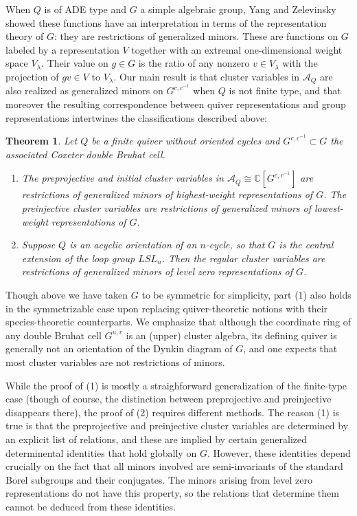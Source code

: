 \documentclass[12pt]{amsart}
\newcommand{\cA}{\mathcal{A}}
\newcommand{\CC}{\mathbb{C}}
\newtheorem{theorem}{Theorem}[section]
\theoremstyle{remark}
\numberwithin{equation}{section}
\begin{document}
When $Q$ is of ADE type and $G$ a simple algebraic group, Yang and Zelevinsky showed these functions have an interpretation in terms of the representation theory of $G$: they are restrictions of generalized minors. 
These are functions on $G$ labeled by a representation $V$ together with an extremal one-dimensional weight space $V_\lambda$. 
Their value on $g \in G$ is the ratio of any nonzero $v \in V_\lambda$ with the projection of $gv \in V$ to $V_\lambda$. 
Our main result is that cluster variables in $\cA_Q$ are also realized as generalized minors on $G^{c,c^{-1}}$ when $Q$ is not finite type, and that moreover the resulting correspondence between quiver representations and group representations intertwines the classifications described above: 

\begin{theorem}\label{thm:maintheorem}
Let $Q$ be a finite quiver without oriented cycles and $G^{c,c^{-1}} \subset G$ the associated Coxeter double Bruhat cell.
\begin{enumerate}
\item The preprojective and initial cluster variables in $\cA_Q \cong \CC[G^{c,c^{-1}}]$ are restrictions of generalized minors of highest-weight representations of $G$. The preinjective cluster variables are restrictions of generalized minors of lowest-weight representations of $G$.
\item Suppose $Q$ is an acyclic orientation of an $n$-cycle, so that $G$ is the central extension of the loop group $LSL_{n}$. Then the regular cluster variables are restrictions of generalized minors of level zero representations of $G$.
\end{enumerate}
\end{theorem}

Though above we have taken $G$ to be symmetric for simplicity, part (1) also holds in the symmetrizable case upon replacing quiver-theoretic notions with their species-theoretic counterparts. 
We emphasize that although the coordinate ring of any double Bruhat cell $G^{u,v}$ is an (upper) cluster algebra, its defining quiver is generally not an orientation of the Dynkin diagram of $G$, and one expects that most cluster variables are not restrictions of minors.

While the proof of (1) is mostly a straighforward generalization of the finite-type case (though of course, the distinction between preprojective and preinjective disappears there), the proof of (2) requires different methods. 
The reason (1) is true is that the preprojective and preinjective cluster variables are determined by an explicit list of relations, and these are implied by certain generalized determinental identities that hold globally on $G$. 
However, these identities depend crucially on the fact that all minors involved are semi-invariants of the standard Borel subgroups and their conjugates. 
The minors arising from level zero representations do not have this property, so the relations that determine them cannot be deduced from these identities.
\end{document}
